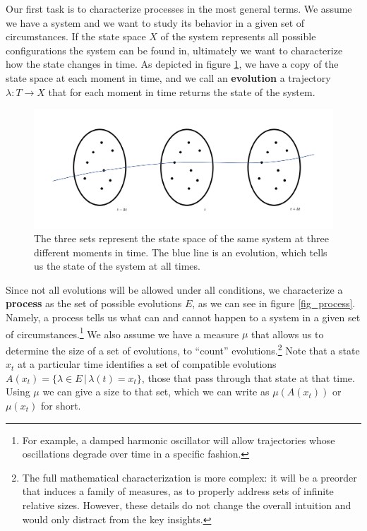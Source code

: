 \documentclass[letterpaper,twocolumn]{article}
\begin{document}
Our first task is to characterize processes in the most general terms. We assume we have a system and we want to study its behavior in a given set of circumstances. If the state space $X$ of the system represents all possible configurations the system can be found in, ultimately we want to characterize how the state changes in time. As depicted in figure \ref{fig_single_evolution}, we have a copy of the state space at each moment in time, and we call an \textbf{evolution} a trajectory $\lambda : T \to X$ that for each moment in time returns the state of the system. 

\begin{figure}[h]
	\includegraphics[width=\columnwidth]{images/Slide1.png}
	\caption{The three sets represent the state space of the same system at three different moments in time. The blue line is an evolution, which tells us the state of the system at all times.}\label{fig_single_evolution}
\end{figure}

Since not all evolutions will be allowed under all conditions, we characterize a \textbf{process} as the set of possible evolutions $E$, as we can see in figure \ref{fig_process}. Namely, a process tells us what can and cannot happen to a system in a given set of circumstances.\footnote{For example, a damped harmonic oscillator will allow trajectories whose oscillations degrade over time in a specific fashion.} We also assume we have a measure $\mu$ that allows us to determine the size of a set of evolutions, to ``count'' evolutions.\footnote{The full mathematical characterization is more complex: it will be a preorder that induces a family of measures, as to properly address sets of infinite relative sizes. However, these details do not change the overall intuition and would only distract from the key insights.} Note that a state $x_t$ at a particular time identifies a set of compatible evolutions $A(x_t) = \{ \lambda \in E \, | \, \lambda(t) = x_t \}$, those that pass through that state at that time. Using $\mu$ we can give a size to that set, which we can write as $\mu(A(x_t))$ or $\mu(x_t)$ for short.
\end{document}
